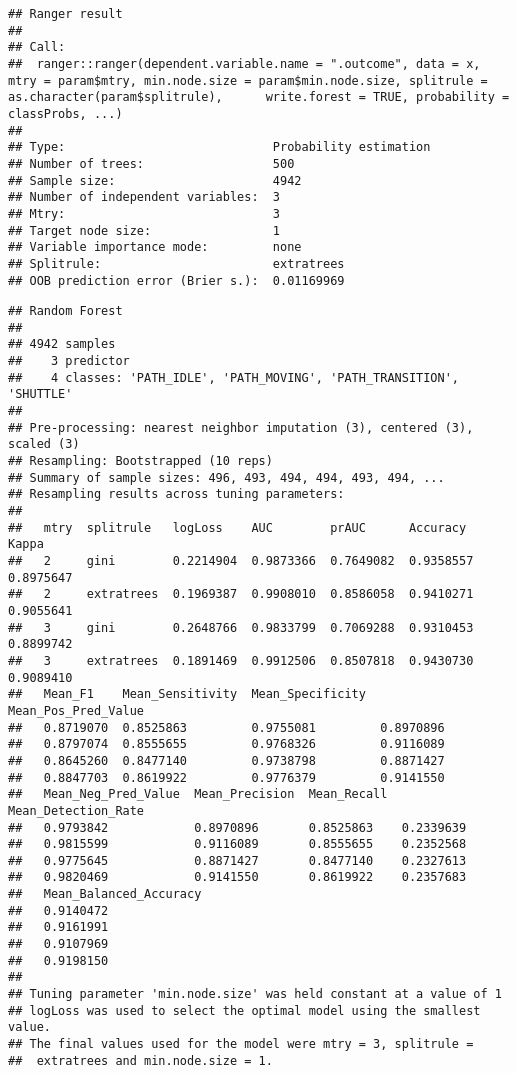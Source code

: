 \documentclass[]{article}
\begin{document}
\begin{verbatim}
## Ranger result
## 
## Call:
##  ranger::ranger(dependent.variable.name = ".outcome", data = x,      mtry = param$mtry, min.node.size = param$min.node.size, splitrule = as.character(param$splitrule),      write.forest = TRUE, probability = classProbs, ...) 
## 
## Type:                             Probability estimation 
## Number of trees:                  500 
## Sample size:                      4942 
## Number of independent variables:  3 
## Mtry:                             3 
## Target node size:                 1 
## Variable importance mode:         none 
## Splitrule:                        extratrees 
## OOB prediction error (Brier s.):  0.01169969
\end{verbatim}

\begin{verbatim}
## Random Forest 
## 
## 4942 samples
##    3 predictor
##    4 classes: 'PATH_IDLE', 'PATH_MOVING', 'PATH_TRANSITION', 'SHUTTLE' 
## 
## Pre-processing: nearest neighbor imputation (3), centered (3), scaled (3) 
## Resampling: Bootstrapped (10 reps) 
## Summary of sample sizes: 496, 493, 494, 494, 493, 494, ... 
## Resampling results across tuning parameters:
## 
##   mtry  splitrule   logLoss    AUC        prAUC      Accuracy   Kappa    
##   2     gini        0.2214904  0.9873366  0.7649082  0.9358557  0.8975647
##   2     extratrees  0.1969387  0.9908010  0.8586058  0.9410271  0.9055641
##   3     gini        0.2648766  0.9833799  0.7069288  0.9310453  0.8899742
##   3     extratrees  0.1891469  0.9912506  0.8507818  0.9430730  0.9089410
##   Mean_F1    Mean_Sensitivity  Mean_Specificity  Mean_Pos_Pred_Value
##   0.8719070  0.8525863         0.9755081         0.8970896          
##   0.8797074  0.8555655         0.9768326         0.9116089          
##   0.8645260  0.8477140         0.9738798         0.8871427          
##   0.8847703  0.8619922         0.9776379         0.9141550          
##   Mean_Neg_Pred_Value  Mean_Precision  Mean_Recall  Mean_Detection_Rate
##   0.9793842            0.8970896       0.8525863    0.2339639          
##   0.9815599            0.9116089       0.8555655    0.2352568          
##   0.9775645            0.8871427       0.8477140    0.2327613          
##   0.9820469            0.9141550       0.8619922    0.2357683          
##   Mean_Balanced_Accuracy
##   0.9140472             
##   0.9161991             
##   0.9107969             
##   0.9198150             
## 
## Tuning parameter 'min.node.size' was held constant at a value of 1
## logLoss was used to select the optimal model using the smallest value.
## The final values used for the model were mtry = 3, splitrule =
##  extratrees and min.node.size = 1.
\end{verbatim}
\end{document}
